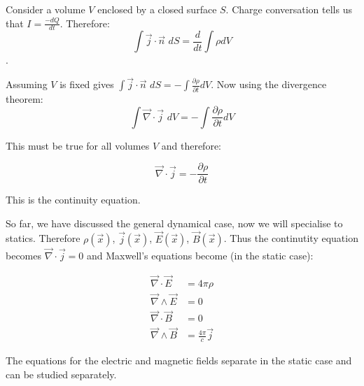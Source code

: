 Consider a volume $V$ enclosed by a closed surface $S$. Charge conversation tells us that $I = \frac{-dQ}{dt}$. Therefore: $$\int \vec{j} \cdot \vec{n} \, \, dS = \frac{d}{dt} \int \rho dV$$.

Assuming $V$ is fixed gives $\int \vec{j} \cdot \vec{n} \, \, dS = - \int \frac{\partial \rho}{\partial t} dV$. Now using the divergence theorem: $$\int \vec{\nabla} \cdot \vec{j} \, \, dV = - \int \frac{\partial \rho}{\partial t} dV$$

This must be true for all volumes $V$ and therefore:

\begin{equation}
\vec{\nabla} \cdot \vec{j} = - \frac{\partial \rho}{\partial t}
\end{equation}

This is the continuity equation.

\vspace{\baselineskip}

So far, we have discussed the general dynamical case, now we will specialise to statics. Therefore $\rho(\vec{x})$, $\vec{j} (\vec{x})$, $\vec{E} (\vec{x})$, $\vec{B} (\vec{x})$. Thus the continutity equation becomes $\vec{\nabla} \cdot \vec{j} = 0$ and Maxwell's equations become (in the static case):

\begin{align*}
\vec{\nabla} \cdot \vec{E} &= 4 \pi \rho \\
\vec{\nabla} \wedge \vec{E} &= 0 \\
\vec{\nabla} \cdot \vec{B} &= 0 \\
\vec{\nabla} \wedge \vec{B} &= \frac{4 \pi}{c} \vec{j}
\end{align*}

The equations for the electric and magnetic fields separate in the static case and can be studied separately.